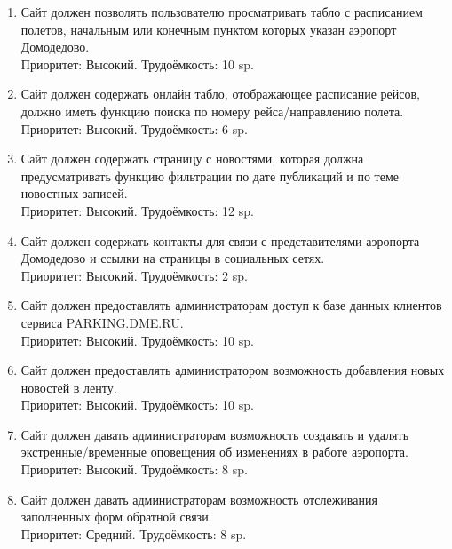 
\begin{enumerate}
      \item Сайт должен позволять пользователю просматривать
            табло с расписанием полетов, начальным или конечным
            пунктом которых указан аэропорт Домодедово. \\
            Приоритет: Высокий. Трудоёмкость: 10 sp.

      \item Сайт должен содержать онлайн табло, отображающее расписание рейсов,
            должно иметь функцию поиска по номеру рейса/направлению полета. \\
            Приоритет: Высокий. Трудоёмкость: 6 sp.

      \item Сайт должен содержать страницу с новостями, которая должна
            предусматривать функцию фильтрации по дате публикаций и по
            теме новостных записей. \\
            Приоритет: Высокий. Трудоёмкость: 12 sp.

      \item Сайт должен содержать контакты для связи с
            представителями аэропорта Домодедово и ссылки
            на страницы в социальных сетях. \\
            Приоритет: Высокий. Трудоёмкость: 2 sp.

      \item Сайт должен предоставлять администраторам
            доступ к базе данных клиентов сервиса
            PARKING.DME.RU. \\
            Приоритет: Высокий. Трудоёмкость: 10 sp.

      \item Сайт должен предоставлять администратором возможность
            добавления новых новостей в ленту. \\
            Приоритет: Высокий. Трудоёмкость: 10 sp.

      \item Сайт должен давать администраторам возможность
            создавать и удалять экстренные/временные
            оповещения об изменениях в работе аэропорта. \\
            Приоритет: Высокий. Трудоёмкость: 8 sp.

      \item Сайт должен давать администраторам возможность
            отслеживания заполненных форм обратной связи. \\
            Приоритет: Средний. Трудоёмкость: 8 sp.


\end{enumerate}
